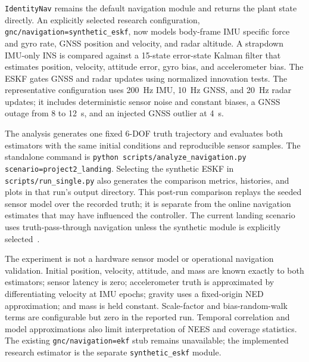 \documentclass[11pt,letterpaper]{article}
\newcommand{\sourcecode}[1]{\texttt{#1}}
\begin{document}
\sourcecode{IdentityNav} remains the default navigation module and returns the plant state directly. An explicitly selected research configuration, \sourcecode{gnc/navigation=synthetic\_eskf}, now models body-frame IMU specific force and gyro rate, GNSS position and velocity, and radar altitude. A strapdown IMU-only INS is compared against a 15-state error-state Kalman filter that estimates position, velocity, attitude error, gyro bias, and accelerometer bias. The ESKF gates GNSS and radar updates using normalized innovation tests. The representative configuration uses 200~Hz IMU, 10~Hz GNSS, and 20~Hz radar updates; it includes deterministic sensor noise and constant biases, a GNSS outage from 8 to 12~s, and an injected GNSS outlier at 4~s.

The analysis generates one fixed 6-DOF truth trajectory and evaluates both estimators with the same initial conditions and reproducible sensor samples. The standalone command is \sourcecode{python scripts/analyze\_navigation.py scenario=project2\_landing}. Selecting the synthetic ESKF in \sourcecode{scripts/run\_single.py} also generates the comparison metrics, histories, and plots in that run's output directory. This post-run comparison replays the seeded sensor model over the recorded truth; it is separate from the online navigation estimates that may have influenced the controller. The current landing scenario uses truth-pass-through navigation unless the synthetic module is explicitly selected~\cite{nav_implementation,configs}.

The experiment is not a hardware sensor model or operational navigation validation. Initial position, velocity, attitude, and mass are known exactly to both estimators; sensor latency is zero; accelerometer truth is approximated by differentiating velocity at IMU epochs; gravity uses a fixed-origin NED approximation; and mass is held constant. Scale-factor and bias-random-walk terms are configurable but zero in the reported run. Temporal correlation and model approximations also limit interpretation of NEES and coverage statistics. The existing \sourcecode{gnc/navigation=ekf} stub remains unavailable; the implemented research estimator is the separate \sourcecode{synthetic\_eskf} module.
\end{document}
